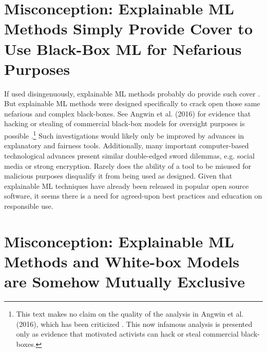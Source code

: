 \documentclass[fleqn]{article}
\begin{document}
\section{Misconception: Explainable ML Methods Simply Provide Cover to Use Black-Box ML for Nefarious Purposes}

If used disingenuously, explainable ML methods probably do provide such cover \cite{fair_washing}. But explainable ML methods were designed specifically to crack open those same nefarious and complex black-boxes. See Angwin et al. (2016) for evidence that hacking or stealing of commercial black-box models for oversight purposes is possible \cite{angwin16}.\footnote{This text makes no claim on the quality of the analysis in Angwin et al. (2016), which has been criticized \cite{flores2016false}. This now infamous analysis is presented only as evidence that motivated activists can hack or steal commercial black-boxes.} Such investigations would likely only be improved by advances in explanatory and fairness tools. Additionally, many important computer-based technological advances present similar double-edged sword dilemmas, e.g. social media or strong encryption. Rarely does the ability of a tool to be misused for malicious purposes disqualify it from being used as designed. Given that explainable ML techniques have already been released in popular open source software, it seems there is a need for agreed-upon best practices and education on responsible use.  


\section{Misconception: Explainable ML Methods and White-box Models are Somehow Mutually Exclusive} \label{sec:white_box}
\end{document}

